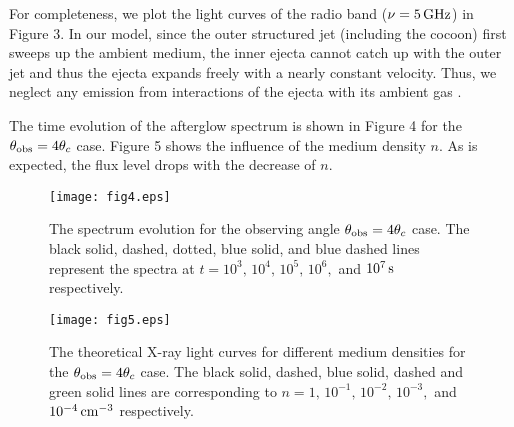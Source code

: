 \documentclass{emulateapj}
\begin{document}
For completeness, we plot the light curves of the radio band ($\nu=5\,\rm GHz$) in Figure 3. In our model, since the outer structured jet (including the cocoon) first sweeps up the ambient medium, the inner ejecta cannot catch up with the outer jet and thus the ejecta expands freely with a nearly constant velocity. Thus, we neglect any emission from interactions of the ejecta with its ambient gas \citep{nak11}. 

The time evolution of the afterglow spectrum is shown in Figure 4 for the $\theta_{\rm obs}=4\theta_c$ case. Figure 5 shows the influence of the medium density $n$. As is expected, the flux level drops with the decrease of $n$.


\begin{figure}
\begin{center}
\texttt{[image: fig4.eps]}
\caption{The spectrum evolution for the observing angle $\theta_{\rm obs}=4\theta_c$ case. The black solid, dashed, dotted, blue solid, and blue dashed lines represent the spectra at $t=10^3,\,10^4,\,10^5,\,10^6,$ and $10^7\,\rm s$ respectively.
\label{fig4}}
\end{center}
\end{figure}


\begin{figure}
\begin{center}
\texttt{[image: fig5.eps]}
\caption{The theoretical X-ray light curves for different medium densities for the $\theta_{\rm obs}=4\theta_c$ case. The black solid, dashed, blue solid, dashed and green solid lines are corresponding to $n=1,\,10^{-1},\,10^{-2},\,10^{-3},$ and $10^{-4}\,\rm cm^{-3}$ respectively.
\label{fig5}}
\end{center}
\end{figure}
\end{document}
